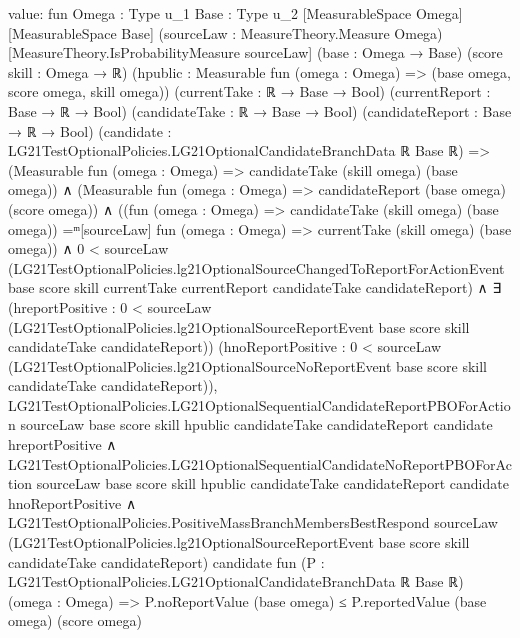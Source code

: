 \documentclass[10pt]{article}
\begin{document}
\begin{ReviewVerbatim}
value:
fun {Omega : Type u_1} {Base : Type u_2} [MeasurableSpace Omega] [MeasurableSpace Base]
    (sourceLaw : MeasureTheory.Measure Omega) [MeasureTheory.IsProbabilityMeasure sourceLaw] (base : Omega → Base)
    (score skill : Omega → ℝ) (hpublic : Measurable fun (omega : Omega) => (base omega, score omega, skill omega))
    (currentTake : ℝ → Base → Bool) (currentReport : Base → ℝ → Bool) (candidateTake : ℝ → Base → Bool)
    (candidateReport : Base → ℝ → Bool)
    (candidate : LG21TestOptionalPolicies.LG21OptionalCandidateBranchData ℝ Base ℝ) =>
  (Measurable fun (omega : Omega) => candidateTake (skill omega) (base omega)) ∧
    (Measurable fun (omega : Omega) => candidateReport (base omega) (score omega)) ∧
      ((fun (omega : Omega) => candidateTake (skill omega) (base omega)) =ᵐ[sourceLaw] fun (omega : Omega) =>
          currentTake (skill omega) (base omega)) ∧
        0 <
            sourceLaw
              (LG21TestOptionalPolicies.lg21OptionalSourceChangedToReportForActionEvent base score skill currentTake
                currentReport candidateTake candidateReport) ∧
          ∃ (hreportPositive :
            0 <
              sourceLaw
                (LG21TestOptionalPolicies.lg21OptionalSourceReportEvent base score skill candidateTake candidateReport))
            (hnoReportPositive :
            0 <
              sourceLaw
                (LG21TestOptionalPolicies.lg21OptionalSourceNoReportEvent base score skill candidateTake
                  candidateReport)),
            LG21TestOptionalPolicies.LG21OptionalSequentialCandidateReportPBOForAction sourceLaw base score skill
                hpublic candidateTake candidateReport candidate hreportPositive ∧
              LG21TestOptionalPolicies.LG21OptionalSequentialCandidateNoReportPBOForAction sourceLaw base score skill
                  hpublic candidateTake candidateReport candidate hnoReportPositive ∧
                LG21TestOptionalPolicies.PositiveMassBranchMembersBestRespond sourceLaw
                  (LG21TestOptionalPolicies.lg21OptionalSourceReportEvent base score skill candidateTake
                    candidateReport)
                  candidate
                  fun (P : LG21TestOptionalPolicies.LG21OptionalCandidateBranchData ℝ Base ℝ) (omega : Omega) =>
                  P.noReportValue (base omega) ≤ P.reportedValue (base omega) (score omega)
\end{ReviewVerbatim}
\end{document}
